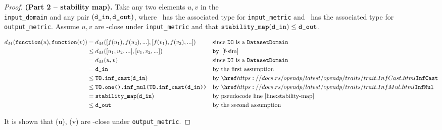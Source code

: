 \documentclass{article}
\begin{document}
\begin{proof} \textbf{(Part 2 -- stability map).} 
    Take any two elements $u, v$ in the \\\texttt{input\_domain} and any pair $(\texttt{d\_in}, \texttt{d\_out})$, 
    where \din\ has the associated type for \texttt{input\_metric} and \dout\ has the associated type for \texttt{output\_metric}.
    Assume $u, v$ are \din-close under \texttt{input\_metric} and that $\texttt{stability\_map}(\texttt{d\_in}) \leq \texttt{d\_out}$. 
    
    \begin{align*}
        d_{M}(\function(u), \function(v)) &= d_{M}([f(u_1), f(u_2), ...], [f(v_1), f(v_2), ...])  && \text{since \texttt{DO} is a }\texttt{DatasetDomain}\\
        &\le d_{M}([u_1, u_2, ...], [v_1, v_2, ...]) && \texttt{by } \ref{f-sim} \\
        &= d_{M}(u, v)  && \text{since \texttt{DI} is a }\texttt{DatasetDomain} \\
        &= \din &&\text{by the first assumption} \\
        &\leq \texttt{TO.inf\_cast}(\din) &&\text{by } \rustdoc{traits/trait}{InfCast} \\
        &\leq \texttt{TO.one().inf\_mul(TO.inf\_cast(\din))} &&\text{by } \rustdoc{traits/trait}{InfMul} \\
        &=\texttt{stability\_map}(\din) &&\text{by pseudocode line } \ref{line:stability-map} \\
        &\leq \dout &&\text{by the second assumption}
    \end{align*}

    It is shown that \function(u), \function(v) are \dout-close under \texttt{output\_metric}.
\end{proof}
\end{document}
